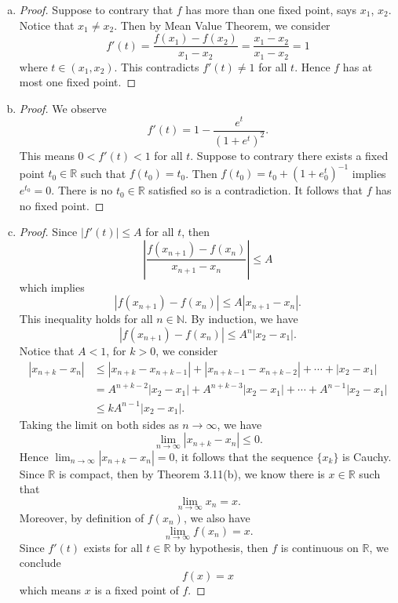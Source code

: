 \begin{Exercise}
\begin{enumerate}[(a)]
\item 
\begin{proof}
Suppose to contrary that $f$ has more than one fixed point, says $x_1$, $x_2$.
Notice that $x_1\neq x_2$.
Then by Mean Value Theorem, we consider
$$
f'(t) = \frac{f(x_1)-f(x_2)}{x_1-x_2}
= \frac{x_1-x_2}{x_1-x_2}
=1
$$
where $t\in (x_1,x_2)$.
This contradicts $f'(t) \neq 1$ for all $t$.
Hence $f$ has at most one fixed point.
\end{proof}

\item
\begin{proof}
We observe
$$
f'(t) = 1-\frac{e^t}{(1+e^t)^2}.
$$
This means $0<f'(t)<1$ for all $t$.
Suppose to contrary there exists a fixed point $t_0\in\mathbb{R}$ such that $f(t_0) = t_0$.
Then $f(t_0) = t_0 + (1+e^t_0)^{-1}$ implies $e^{t_0} = 0$.
There is no $t_0\in\mathbb{R}$ satisfied so is a contradiction.
It follows that $f$ has no fixed point.
\end{proof}

\item
\begin{proof}
Since $|f'(t)| \leq A$ for all $t$, then
$$
\left| \frac{f(x_{n+1})-f(x_n)}{x_{n+1}-x_n} \right | \leq A
$$
which implies
$$
\left| f(x_{n+1})-f(x_n) \right| \leq A \left| x_{n+1}-x_n \right|.
$$
This inequality holds for all $n\in\mathbb{N}$. By induction, we have
$$
|f(x_{n+1})-f(x_n)| \leq A^n | x_2-x_1 |.
$$
Notice that $A < 1$, for $k > 0$, we consider
\begin{align*}
| x_{n+k} - x_n |
&\leq |x_{n+k}-x_{n+k-1}| + |x_{n+k-1}-x_{n+k-2}| + \cdots + | x_2 - x_1 | \\
&= A^{n+k-2} |x_2-x_1| + A^{n+k-3} |x_2-x_1| + \cdots + A^{n-1} |x_2 - x_1| \\
&\leq k A^{n-1} | x_2-x_1 |.
\end{align*}
Taking the limit on both sides as $n\to\infty$, we have
$$
\lim_{n\to\infty} |x_{n+k}-x_n| \leq 0.
$$
Hence $\lim_{n\to\infty}|x_{n+k}-x_n| = 0$, it follows that the sequence $\{x_k\}$ is Cauchy.
Since $\mathbb{R}$ is compact, then by Theorem 3.11(b), we know there is $x\in\mathbb{R}$ such that 
$$
\lim_{n\to\infty} x_n = x.
$$
Moreover, by definition of $f(x_n)$, we also have 
$$
\lim_{n\to\infty} f(x_n) = x.
$$
Since $f'(t)$ exists for all $t\in\mathbb{R}$ by hypothesis, then $f$ is continuous on $\mathbb{R}$, we conclude
$$
f(x) = x
$$
which means $x$ is a fixed point of $f$.
\end{proof}


\end{enumerate}
\end{Exercise}
